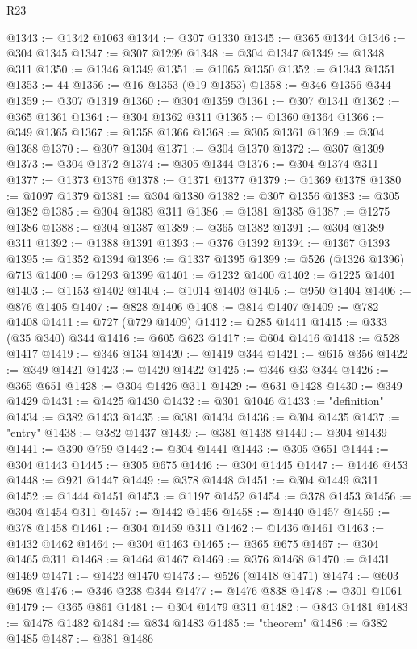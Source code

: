 \begin{lexlean}{R23}
\begin{coremodule}
@1343 := @1342 @1063
@1344 := @307 @1330
@1345 := @365 @1344
@1346 := @304 @1345
@1347 := @307 @1299
@1348 := @304 @1347
@1349 := @1348 @311
@1350 := @1346 @1349
@1351 := @1065 @1350
@1352 := @1343 @1351
@1353 := 44
@1356 := @16 @1353 (@19 @1353)
@1358 := @346 @1356 @344
@1359 := @307 @1319
@1360 := @304 @1359
@1361 := @307 @1341
@1362 := @365 @1361
@1364 := @304 @1362 @311
@1365 := @1360 @1364
@1366 := @349 @1365
@1367 := @1358 @1366
@1368 := @305 @1361
@1369 := @304 @1368
@1370 := @307 @1304
@1371 := @304 @1370
@1372 := @307 @1309
@1373 := @304 @1372
@1374 := @305 @1344
@1376 := @304 @1374 @311
@1377 := @1373 @1376
@1378 := @1371 @1377
@1379 := @1369 @1378
@1380 := @1097 @1379
@1381 := @304 @1380
@1382 := @307 @1356
@1383 := @305 @1382
@1385 := @304 @1383 @311
@1386 := @1381 @1385
@1387 := @1275 @1386
@1388 := @304 @1387
@1389 := @365 @1382
@1391 := @304 @1389 @311
@1392 := @1388 @1391
@1393 := @376 @1392
@1394 := @1367 @1393
@1395 := @1352 @1394
@1396 := @1337 @1395
@1399 := @526 (@1326 @1396) @713
@1400 := @1293 @1399
@1401 := @1232 @1400
@1402 := @1225 @1401
@1403 := @1153 @1402
@1404 := @1014 @1403
@1405 := @950 @1404
@1406 := @876 @1405
@1407 := @828 @1406
@1408 := @814 @1407
@1409 := @782 @1408
@1411 := @727 (@729 @1409)
@1412 := @285 @1411
@1415 := @333 (@35 @340) @344
@1416 := @605 @623
@1417 := @604 @1416
@1418 := @528 @1417
@1419 := @346 @134
@1420 := @1419 @344
@1421 := @615 @356
@1422 := @349 @1421
@1423 := @1420 @1422
@1425 := @346 @33 @344
@1426 := @365 @651
@1428 := @304 @1426 @311
@1429 := @631 @1428
@1430 := @349 @1429
@1431 := @1425 @1430
@1432 := @301 @1046
@1433 := "definition"
@1434 := @382 @1433
@1435 := @381 @1434
@1436 := @304 @1435
@1437 := "entry"
@1438 := @382 @1437
@1439 := @381 @1438
@1440 := @304 @1439
@1441 := @390 @759
@1442 := @304 @1441
@1443 := @305 @651
@1444 := @304 @1443
@1445 := @305 @675
@1446 := @304 @1445
@1447 := @1446 @453
@1448 := @921 @1447
@1449 := @378 @1448
@1451 := @304 @1449 @311
@1452 := @1444 @1451
@1453 := @1197 @1452
@1454 := @378 @1453
@1456 := @304 @1454 @311
@1457 := @1442 @1456
@1458 := @1440 @1457
@1459 := @378 @1458
@1461 := @304 @1459 @311
@1462 := @1436 @1461
@1463 := @1432 @1462
@1464 := @304 @1463
@1465 := @365 @675
@1467 := @304 @1465 @311
@1468 := @1464 @1467
@1469 := @376 @1468
@1470 := @1431 @1469
@1471 := @1423 @1470
@1473 := @526 (@1418 @1471)
@1474 := @603 @698
@1476 := @346 @238 @344
@1477 := @1476 @838
@1478 := @301 @1061
@1479 := @365 @861
@1481 := @304 @1479 @311
@1482 := @843 @1481
@1483 := @1478 @1482
@1484 := @834 @1483
@1485 := "theorem"
@1486 := @382 @1485
@1487 := @381 @1486

\end{coremodule}
\end{lexlean}
